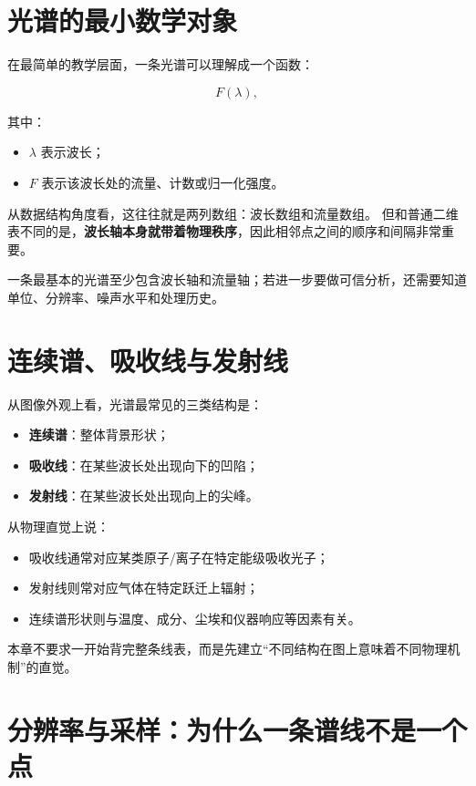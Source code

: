 \section{光谱的最小数学对象}

在最简单的教学层面，一条光谱可以理解成一个函数：

\[
F(\lambda),
\]

其中：

\begin{itemize}
    \item $\lambda$ 表示波长；
    \item $F$ 表示该波长处的流量、计数或归一化强度。
\end{itemize}

从数据结构角度看，这往往就是两列数组：波长数组和流量数组。  
但和普通二维表不同的是，\textbf{波长轴本身就带着物理秩序}，因此相邻点之间的顺序和间隔非常重要。

\begin{defbox}[光谱的最小结构]
一条最基本的光谱至少包含波长轴和流量轴；若进一步要做可信分析，还需要知道单位、分辨率、噪声水平和处理历史。
\end{defbox}

\section{连续谱、吸收线与发射线}

从图像外观上看，光谱最常见的三类结构是：

\begin{itemize}
    \item \textbf{连续谱}：整体背景形状；
    \item \textbf{吸收线}：在某些波长处出现向下的凹陷；
    \item \textbf{发射线}：在某些波长处出现向上的尖峰。
\end{itemize}

从物理直觉上说：

\begin{itemize}
    \item 吸收线通常对应某类原子/离子在特定能级吸收光子；
    \item 发射线则常对应气体在特定跃迁上辐射；
    \item 连续谱形状则与温度、成分、尘埃和仪器响应等因素有关。
\end{itemize}

本章不要求一开始背完整条线表，而是先建立“不同结构在图上意味着不同物理机制”的直觉。

\section{分辨率与采样：为什么一条谱线不是一个点}

